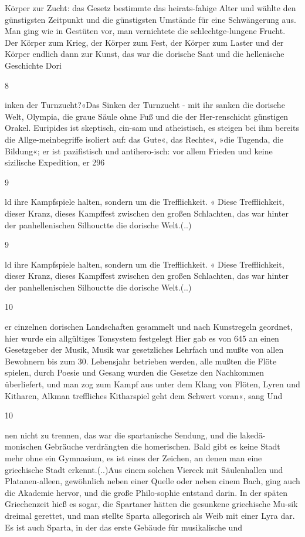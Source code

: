\documentclass[
  letterpaper,
  DIV=11,
  numbers=noendperiod]{scrartcl}
\begin{document}
Körper zur Zucht: das Gesetz bestimmte das heirats-fahige Alter und
wählte den günstigsten Zeitpunkt und die günstigsten Umstände für eine
Schwängerung aus. Man ging wie in Gestüten vor, man vernichtete die
schlechtge-lungene Frucht. Der Körper zum Krieg, der Körper zum Fest,
der Körper zum Laster und der Körper endlich dann zur Kunst, das war die
dorische Saat und die hellenische Geschichte Dori

8

inken der Turnzucht?«Das Sinken der Turnzucht - mit ihr sanken die
dorische Welt, Olympia, die graue Säule ohne Fuß und die der
Her-renschicht günstigen Orakel. Euripides ist skeptisch, cin-sam und
atheistisch, es steigen bei ihm bereits die Allge-meinbegriffe isoliert
auf: das Gute«, das Rechte«, »die Tugenda, die Bildung«; er ist
pazifistisch und antihero-isch: vor allem Frieden und keine sizilische
Expedition, er 296

9

ld ihre Kampfspiele halten, sondern um die Trefflichkeit. « Diese
Trefflichkeit, dieser Kranz, dieses Kampffest zwischen den großen
Schlachten, das war hinter der panhellenischen Silhouctte die dorische
Welt.(..)

9

ld ihre Kampfspiele halten, sondern um die Trefflichkeit. « Diese
Trefflichkeit, dieser Kranz, dieses Kampffest zwischen den großen
Schlachten, das war hinter der panhellenischen Silhouctte die dorische
Welt.(..)

10

er cinzelnen dorischen Landschaften gesammelt und nach Kunstregeln
geordnet, hier wurde ein allgültiges Tonsystem festgelegt Hier gab es
von 645 an einen Gesetzgeber der Musik, Musik war gesetzliches Lehrfach
und mußte von allen Bewohnern bis zum 30. Lebensjahr betrieben werden,
alle mußten die Flöte spielen, durch Poesie und Gesang wurden die
Gesetze den Nachkommen überliefert, und man zog zum Kampf aus unter dem
Klang von Flöten, Lyren und Kitharen, Alkman treffliches Kitharspiel
geht dem Schwert voran«, sang Und

10

nen nicht zu trennen, das war die spartanische Sendung, und die
lakedä-monischen Gebräuche verdrängten die homerischen. Bald gibt es
keine Stadt mehr ohne ein Gymnasium, es ist eines der Zeichen, an denen
man eine griechische Stadt erkennt.(..)Aus cinem solchen Viereck mit
Säulenhallen und Platanen-alleen, gewöhnlich neben einer Quelle oder
neben cinem Bach, ging auch dic Akademie hervor, und die große
Philo-sophie entstand darin. In der späten Griechenzeit hicß es sogar,
die Spartaner hätten die gesunkene griechische Mu-sik dreimal gerettet,
und man stellte Sparta allegorisch als Weib mit einer Lyra dar. Es ist
auch Sparta, in der das erste Gebäude für musikalische und
\end{document}
